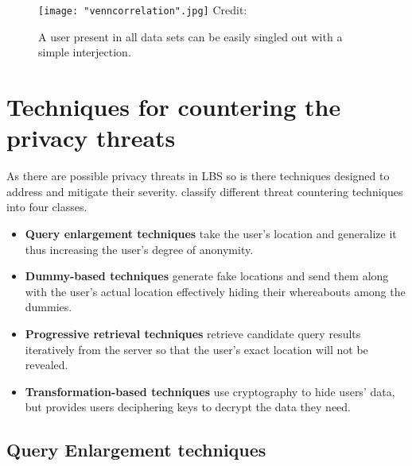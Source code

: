 \documentclass[english]{tktltiki2}
\theoremstyle{definition}
\theoremstyle{remark}
\begin{document}
\begin{figure}[ht!]
\centering
{}
\texttt{[image: "venncorrelation".jpg]}
\hbox{\scriptsize Credit:}
\caption{A user present in all data sets can be easily singled out with a simple interjection.}
\label{fig:venn}
\end{figure} 
\pagebreak
\section{Techniques for countering the privacy threats}

As there are possible privacy threats in LBS so is there techniques designed to address and mitigate their severity. \cite{Jensen2009} classify different threat countering techniques into four classes.
\begin{itemize}
\item \textbf{Query enlargement techniques} take the user's location and generalize it thus increasing the user's degree of anonymity. 
\item \textbf{Dummy-based techniques} generate fake locations and send them along with the user's actual location effectively hiding their whereabouts among the dummies.
\item \textbf{Progressive retrieval techniques} retrieve candidate query results iteratively from the server so that the user's exact location will not be revealed.
\pagebreak
\item \textbf{Transformation-based techniques} use cryptography to hide users' data, but provides users deciphering keys to decrypt the data they need. 
\end{itemize}

\subsection{Query Enlargement techniques}
\end{document}
